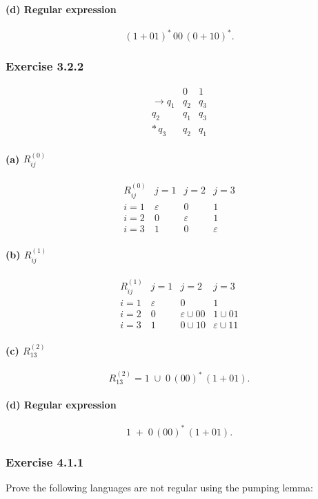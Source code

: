 \documentclass{article}
\theoremstyle{theorem}
\theoremstyle{definition}
\theoremstyle{remark}
\begin{document}
\paragraph{(d) Regular expression}
\[
(1 + 01)^*\,00\,(0 + 10)^*.
\]

\subsubsection{Exercise 3.2.2}
\[
\begin{array}{c|cc}
     &0&1\\\hline
\to q_1 & q_2 & q_3\\
      q_2 & q_1 & q_3\\
*\,q_3 & q_2 & q_1
\end{array}
\]
\paragraph{(a) \(R_{ij}^{(0)}\)}
\[
\begin{array}{c|ccc}
R_{ij}^{(0)} & j=1 & j=2 & j=3\\\hline
i=1 & \varepsilon & 0 & 1\\
i=2 & 0 & \varepsilon & 1\\
i=3 & 1 & 0 & \varepsilon
\end{array}
\]
\paragraph{(b) \(R_{ij}^{(1)}\)}
\[
\begin{array}{c|ccc}
R_{ij}^{(1)} & j=1 & j=2 & j=3\\\hline
i=1 & \varepsilon & 0 & 1\\
i=2 & 0 & \varepsilon\cup00 & 1\cup01\\
i=3 & 1 & 0\cup10 & \varepsilon\cup11
\end{array}
\]
\paragraph{(c) \(R_{13}^{(2)}\)}
\[
R_{13}^{(2)} = 1 \;\cup\;0\,(00)^*\,(1+01).
\]
\paragraph{(d) Regular expression}
\[
1 \;+\;0\,(00)^*\,(1+01).
\]

\subsubsection{Exercise 4.1.1}
Prove the following languages are not regular using the pumping lemma:
\end{document}
